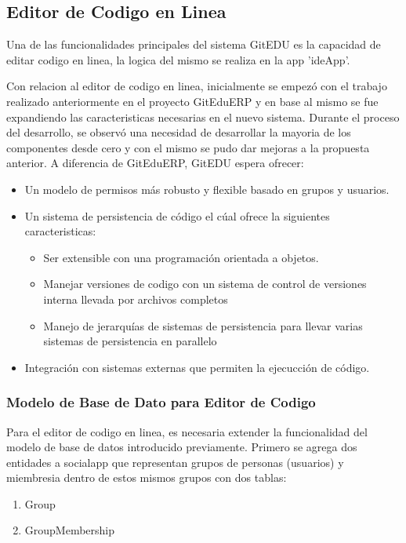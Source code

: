 \subsection{Editor de Codigo en Linea}
Una de las funcionalidades principales del sistema GitEDU es la capacidad de editar codigo en linea, la logica del mismo se realiza en la app 'ideApp'.

Con relacion al editor de codigo en linea, inicialmente se empezó con el trabajo realizado anteriormente en el proyecto GitEduERP y en base al mismo se fue expandiendo las caracteristicas necesarias en el nuevo sistema. Durante el proceso del desarrollo, se observó una necesidad de desarrollar la mayoria de los componentes desde cero y con el mismo se pudo dar mejoras a la propuesta anterior. A diferencia de GitEduERP, GitEDU espera ofrecer:
\begin{itemize}
  \item Un modelo de permisos más robusto y flexible basado en grupos y usuarios.
  \item Un sistema de persistencia de código el cúal ofrece la siguientes caracteristicas:
    \begin{itemize}
      \item Ser extensible con una programación orientada a objetos.
      \item Manejar versiones de codigo con un sistema de control de versiones interna llevada por archivos completos
      \item Manejo de jerarquías de sistemas de persistencia para llevar varias sistemas de persistencia en parallelo
    \end{itemize}
   \item Integración con sistemas externas que permiten la ejecucción de código.
\end{itemize}

\subsubsection{Modelo de Base de Dato para Editor de Codigo}
Para el editor de codigo en linea, es necesaria extender la funcionalidad del modelo de base de datos introducido previamente. Primero se agrega dos entidades a socialapp que representan grupos de personas (usuarios) y miembresia dentro de estos mismos grupos con dos tablas:
\begin{enumerate}
\item Group
\item GroupMembership
\end{enumerate}

